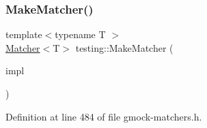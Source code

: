 \subsubsection{\texorpdfstring{Make\+Matcher()}{MakeMatcher()}}
{\footnotesize\ttfamily template$<$typename T $>$ \\
\hyperlink{classtesting_1_1Matcher}{Matcher}$<$T$>$ testing\+::\+Make\+Matcher (\begin{DoxyParamCaption}\item[{const \hyperlink{classtesting_1_1MatcherInterface}{Matcher\+Interface}$<$ T $>$ $\ast$}]{impl }\end{DoxyParamCaption})\hspace{0.3cm}{\ttfamily [inline]}}



Definition at line 484 of file gmock-\/matchers.\+h.



